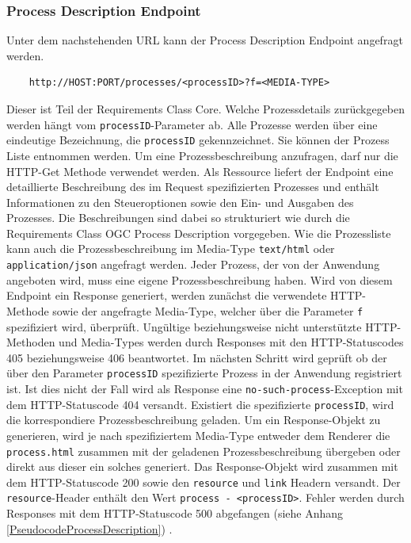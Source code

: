 \subsubsection{Process Description Endpoint}
Unter dem nachstehenden URL kann der Process Description Endpoint angefragt werden. 
\begin{center}
\begin{BVerbatim}
    http://HOST:PORT/processes/<processID>?f=<MEDIA-TYPE>
\end{BVerbatim}
\end{center}
Dieser ist Teil der Requirements Class Core. 
Welche Prozessdetails zurückgegeben werden hängt vom \verb|processID|-Parameter ab. Alle Prozesse werden über eine 
eindeutige Bezeichnung, die \verb|processID| gekennzeichnet. 
Sie können der Prozess Liste entnommen werden. Um eine Prozessbeschreibung anzufragen, darf nur die HTTP-Get Methode verwendet werden.   
Als Ressource liefert der Endpoint eine detaillierte Beschreibung des im Request spezifizierten Prozesses und enthält Informationen 
zu den Steueroptionen sowie den Ein- und Ausgaben des Prozesses.
Die Beschreibungen sind dabei so strukturiert wie durch die Requirements Class OGC Process Description vorgegeben. 
Wie die Prozessliste kann auch die Prozessbeschreibung im Media-Type \verb|text/html|
oder \verb|application/json| angefragt werden.
Jeder Prozess, der von der Anwendung angeboten wird, muss eine eigene Prozessbeschreibung haben.
Wird von diesem Endpoint ein Response generiert, werden zunächst die verwendete HTTP-Methode sowie der angefragte Media-Type, welcher über die 
Parameter \verb|f| spezifiziert wird, überprüft. Ungültige beziehungsweise nicht unterstützte HTTP-Methoden 
und Media-Types werden durch Responses mit den HTTP-Statuscodes 405 beziehungsweise 406 beantwortet.  
Im nächsten Schritt wird geprüft ob der über den Parameter \verb|processID| spezifizierte Prozess in der Anwendung registriert ist. 
Ist dies nicht der Fall wird als Response eine \verb|no-such-process|-Exception 
mit dem HTTP-Statuscode 404 versandt. 
Existiert die spezifizierte \verb|processID|, wird die korrespondiere Prozessbeschreibung geladen. Um ein Response-Objekt zu generieren, 
wird je nach spezifiziertem Media-Type entweder dem Renderer die \verb|process.html| zusammen mit der geladenen Prozessbeschreibung übergeben oder 
direkt aus dieser ein solches generiert. 
Das Response-Objekt wird zusammen mit dem HTTP-Statuscode 200 sowie den \verb|resource| und \verb|link| Headern versandt. 
Der \verb|resource|-Header enthält den Wert \verb|process - <processID>|. 
Fehler werden durch Responses mit dem HTTP-Statuscode 500 
abgefangen (siehe Anhang \ref{PseudocodeProcessDescription}) \cite{code,ogc_api_processes_core}.

